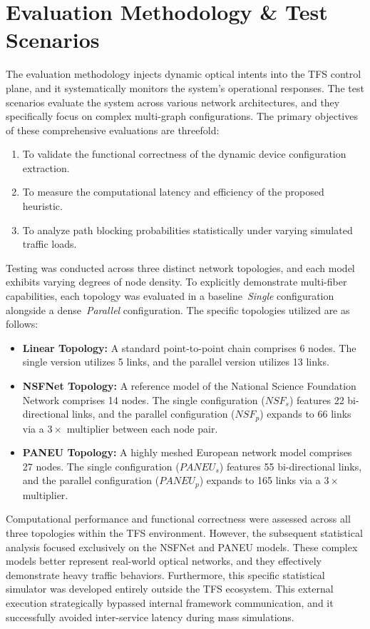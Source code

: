 \documentclass[12pt, a4paper, twoside, openright]{report}
\begin{document}
\section{Evaluation Methodology \& Test Scenarios}
The evaluation methodology injects dynamic optical intents into the TFS control plane, and it systematically monitors the system's operational responses. The test scenarios evaluate the system across various network architectures, and they specifically focus on complex multi-graph configurations. The primary objectives of these comprehensive evaluations are threefold:
\begin{enumerate}
    \item To validate the functional correctness of the dynamic device configuration extraction.\item To measure the computational latency and efficiency of the proposed heuristic.
    \item To analyze path blocking probabilities statistically under varying simulated traffic loads.
\end{enumerate}
Testing was conducted across three distinct network topologies, and each model exhibits varying degrees of node density. To explicitly demonstrate multi-fiber capabilities, each topology was evaluated in a baseline~\emph{Single} configuration alongside a dense~\emph{Parallel} configuration. The specific topologies utilized are as follows:
\begin{itemize}
    \item \textbf{Linear Topology:} A standard point-to-point chain comprises 6 nodes. The single version utilizes 5 links, and the parallel version utilizes 13 links.
    \item \textbf{NSFNet Topology:} A reference model of the National Science Foundation Network comprises 14 nodes. The single configuration ($NSF_s$) features 22 bi-directional links, and the parallel configuration ($NSF_p$) expands to 66 links via a $3\times$ multiplier between each node pair.
    \item \textbf{PANEU Topology:} A highly meshed European network model comprises 27 nodes. The single configuration ($PANEU_s$) features 55 bi-directional links, and the parallel configuration ($PANEU_p$) expands to 165 links via a $3\times$ multiplier.
\end{itemize}
Computational performance and functional correctness were assessed across all three topologies within the TFS environment. However, the subsequent statistical analysis focused exclusively on the NSFNet and PANEU models. These complex models better represent real-world optical networks, and they effectively demonstrate heavy traffic behaviors. Furthermore, this specific statistical simulator was developed entirely outside the TFS ecosystem. This external execution strategically bypassed internal framework communication, and it successfully avoided inter-service latency during mass simulations.
\end{document}
